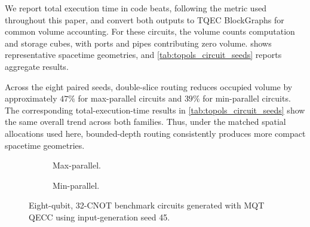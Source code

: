 \documentclass[aps, prx, 10pt, superscriptaddress, longbibliography, twocolumn]{revtex4-2}
\begin{document}
We report total execution time in code beats, following the metric used throughout this paper, and convert both outputs to TQEC BlockGraphs for common volume accounting.
For these circuits, the volume counts computation and storage cubes, with ports and pipes contributing zero volume.
 shows representative spacetime geometries, and \cref{tab:topols_circuit_seeds} reports aggregate results.

Across the eight paired seeds, double-slice routing reduces occupied volume by approximately $47\%$ for max-parallel circuits and $39\%$ for min-parallel circuits.
The corresponding total-execution-time results in \cref{tab:topols_circuit_seeds} show the same overall trend across both families.
Thus, under the matched spatial allocations used here, bounded-depth routing consistently produces more compact spacetime geometries.



\begin{figure}[t]
    \centering
    \begin{subfigure}[t]{0.49\linewidth}
        \centering
        \resizebox*{!}{0.27\textwidth}{}
        \caption{Max-parallel.}
        \label{fig:comparison_input_max}
    \end{subfigure}
    \hfill
    \begin{subfigure}[t]{0.49\linewidth}
        \centering
        \resizebox*{!}{0.27\textwidth}{}
        \caption{Min-parallel.}
        \label{fig:comparison_input_min}
    \end{subfigure}
    \caption{Eight-qubit, 32-CNOT benchmark circuits generated with MQT QECC using input-generation seed 45.}
    \label{fig:comparison_inputs}
\end{figure}
\end{document}
